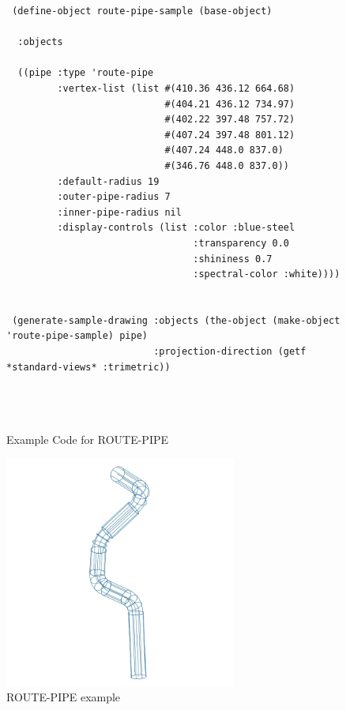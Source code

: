 \documentclass [11pt]{book}
\begin{document}
\begin{itemize}
\begin{figure}
\begin{lrbox}{\boxedverb}
\begin{minipage}{\linewidth}
{\begin{verbatim}
 (define-object route-pipe-sample (base-object)

  :objects

  ((pipe :type 'route-pipe
         :vertex-list (list #(410.36 436.12 664.68) 
                            #(404.21 436.12 734.97) 
                            #(402.22 397.48 757.72) 
                            #(407.24 397.48 801.12) 
                            #(407.24 448.0 837.0)
                            #(346.76 448.0 837.0))
         :default-radius 19
         :outer-pipe-radius 7
         :inner-pipe-radius nil
         :display-controls (list :color :blue-steel 
                                 :transparency 0.0 
                                 :shininess 0.7 
                                 :spectral-color :white))))

 
 (generate-sample-drawing :objects (the-object (make-object 'route-pipe-sample) pipe)
                          :projection-direction (getf *standard-views* :trimetric))
  



\end{verbatim}}
\end{minipage}
\end{lrbox}
\fbox{\usebox{\boxedverb}}

\caption{Example Code for ROUTE-PIPE}

\label{fig:example-code-ROUTE-PIPE}

\end{figure}

\begin{figure}
\begin{center}
\includegraphics[width=3in,height=3in]{../images/example-ROUTE-PIPE.pdf}
\end{center}

\caption{ROUTE-PIPE example}


\end{figure}
\end{itemize}
\end{document}
